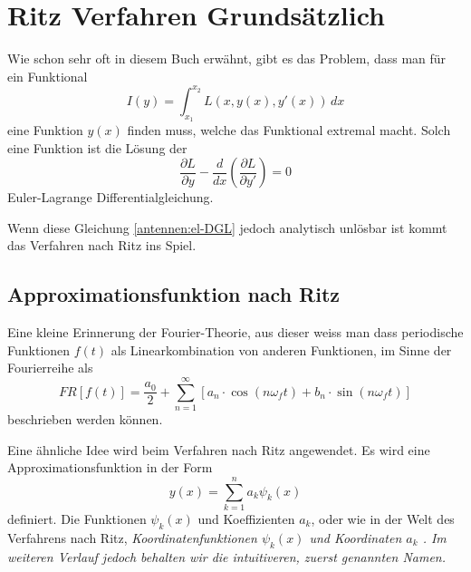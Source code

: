%
%
% 
%
%

\section{Ritz Verfahren Grundsätzlich\label{antennen:ritzGrundsätzlich}}

Wie schon sehr oft in diesem Buch erwähnt, gibt es das Problem, dass man für ein Funktional
\begin{equation}
I(y)
=
\int_{x_1}^{x_2}L(x,y(x),y'(x))\,dx
\label{antennen:normalesFunktional}
\end{equation}
eine Funktion $y(x)$ finden muss, welche das Funktional extremal macht.
Solch eine Funktion ist die Lösung der
\begin{equation}
\frac{\partial L}{\partial y} - \frac{d}{dx} \left( \frac{\partial L}{\partial y'} \right) = 0
\label{antennen:el-DGL}
\end{equation}
Euler-Lagrange Differentialgleichung.

Wenn diese Gleichung \eqref{antennen:el-DGL} jedoch analytisch unlösbar ist 
kommt das Verfahren nach Ritz ins Spiel.

\subsection{Approximationsfunktion nach Ritz\label{antennen:approxFunkt}}

Eine kleine Erinnerung der Fourier-Theorie, aus dieser weiss man dass 
periodische Funktionen $f(t)$ als Linearkombination von anderen Funktionen, 
im Sinne der Fourierreihe als
\begin{equation}
FR[f(t)]
=
\frac{a_0}{2}+\sum_{n=1}^{\infty}\left[a_n\cdot\cos\left
(n\omega_f t\right)+b_n\cdot\sin\left(n\omega_f t\right)\right]
\label{antennen:fourier}
\end{equation}
beschrieben werden können.

Eine ähnliche Idee wird beim Verfahren nach Ritz angewendet.
Es wird eine Approximationsfunktion in der Form
\begin{equation}
y(x)=\sum_{k=1}^n a_k \psi_k(x)
\label{antennen:ritzFunkt}
\end{equation}
definiert. Die Funktionen $\psi_k(x)$ und Koeffizienten $a_k$, oder
wie in der Welt des Verfahrens nach Ritz,  
\em Koordinatenfunktionen $\psi_k(x)$ \em und \em Koordinaten $a_k$ \em.
Im weiteren Verlauf jedoch behalten wir die intuitiveren, zuerst genannten Namen.

